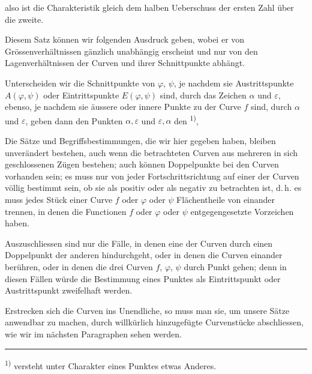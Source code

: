 also ist die Charakteristik gleich dem halben Ueberschuss der ersten Zahl über die zweite.

Diesem Satz können wir folgenden Ausdruck geben, wobei er von Grössenverhältnissen gänzlich unabhängig erscheint und nur von den Lagenverhältnissen der Curven und ihrer Schnittpunkte abhängt.

Unterscheiden wir die Schnittpunkte von $\varphi$, $\psi$, je nachdem sie Austrittspunkte $A(\varphi,\psi)$ oder Eintrittspunkte $E(\varphi,\psi)$ sind, durch das Zeichen $\alpha$ und $\varepsilon$, ebenso, je nachdem sie äussere oder innere Punkte zu der Curve $f$ sind, durch $\alpha$ und $\varepsilon$, geben dann den Punkten $\alpha,\varepsilon$ und $\varepsilon,\alpha$ den \textsuperscript{1)}, 

Die Sätze und Begriffsbestimmungen, die wir hier gegeben haben, bleiben unverändert bestehen, auch wenn die betrachteten Curven aus mehreren in sich geschlossenen Zügen bestehen; auch können Doppelpunkte bei den Curven vorhanden sein; es muss nur von jeder Fortschrittsrichtung auf einer der Curven völlig bestimmt sein, ob sie als positiv oder als negativ zu betrachten ist, d.\,h. es muss jedes Stück einer Curve $f$ oder $\varphi$ oder $\psi$ Flächentheile von einander trennen, in denen die Functionen $f$ oder $\varphi$ oder $\psi$ entgegengesetzte Vorzeichen haben.

Auszuschliessen sind nur die Fälle, in denen eine der Curven durch einen Doppelpunkt der anderen hindurchgeht, oder in denen die Curven einander berühren, oder in denen die drei Curven $f$, $\varphi$, $\psi$ durch  Punkt gehen; denn in diesen Fällen würde die Bestimmung eines Punktes als Eintrittspunkt oder Austrittspunkt zweifelhaft werden.

Erstrecken sich die Curven ins Unendliche, so muss man sie, um unsere Sätze anwendbar zu machen, durch willkürlich hinzugefügte Curvenstücke abschliessen, wie wir im nächsten Paragraphen sehen werden.

\noindent\rule{4cm}{0.4pt}

\noindent\textsuperscript{1)}  versteht unter Charakter eines Punktes etwas Anderes.
